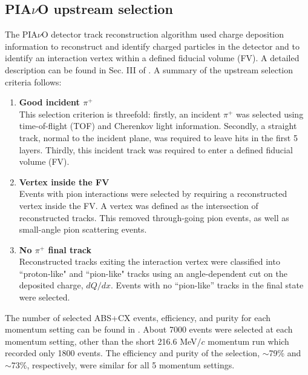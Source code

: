 \subsection{PIA$\nu$O upstream selection}
The PIA$\nu$O detector track reconstruction algorithm used charge deposition information to reconstruct and identify charged particles in the detector and to identify an interaction vertex within a defined fiducial volume (FV). A detailed description can be found in Sec. III of \cite{duet}. A summary of the upstream selection criteria follows:
\begin{enumerate}
\item {\bf Good incident $\pi^{+}$\\}
This selection criterion is threefold: firstly, an incident $\pi^{+}$ was selected using time-of-flight (TOF) and Cherenkov light information. Secondly, a straight track, normal to the incident plane, was required to leave hits in the first 5 layers. Thirdly, this incident track was required to enter a defined fiducial volume (FV).
\item {\bf Vertex inside the FV\\}
Events with pion interactions were selected by requiring a reconstructed vertex inside the FV.  A vertex was defined as the intersection of reconstructed tracks. This removed through-going pion events, as well as small-angle pion scattering events.
\item {\bf No $\pi^{+}$ final track\\}
Reconstructed tracks exiting the interaction vertex were classified into ``proton-like" and ``pion-like" tracks using an angle-dependent cut on the deposited charge, $dQ/dx$. Events with no ``pion-like'' tracks in the final state were selected.
\end{enumerate}
The number of selected ABS+CX events, efficiency, and purity for each momentum setting can be found in \cite{duet}. About 7000 events were selected at each momentum setting, other than the short 216.6 MeV$/c$ momentum run which recorded only 1800 events. The efficiency and purity of the selection, $\sim$79\% and $\sim$73\%, respectively, were similar for all 5 momentum settings.

